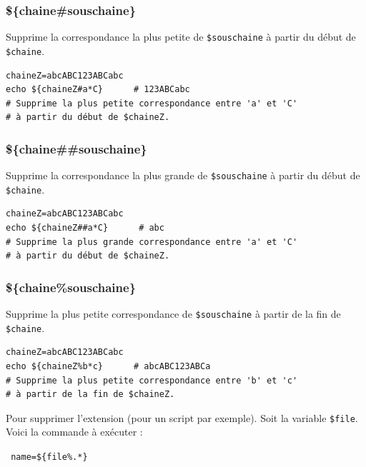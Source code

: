 \documentclass[a4paper,twoside]{article}
\begin{document}
\subsubsection{\$\{chaine\#souschaine\}}
Supprime la correspondance la plus petite de \verb|$souschaine| à partir du début de \verb|$chaine|.

\begin{exemple}
\begin{verbatim}
chaineZ=abcABC123ABCabc
echo ${chaineZ#a*C}      # 123ABCabc
# Supprime la plus petite correspondance entre 'a' et 'C'
# à partir du début de $chaineZ.
\end{verbatim}
\end{exemple}

\subsubsection{\$\{chaine\#\#souschaine\}}
Supprime la correspondance la plus grande de \verb|$souschaine| à partir du début de \verb|$chaine|.

\begin{exemple}
\begin{verbatim}
chaineZ=abcABC123ABCabc
echo ${chaineZ##a*C}      # abc
# Supprime la plus grande correspondance entre 'a' et 'C'
# à partir du début de $chaineZ.
\end{verbatim}
\end{exemple}

\subsubsection{\$\{chaine\%souschaine\}}
Supprime la plus petite correspondance de \verb|$souschaine| à partir de la fin de \verb|$chaine|.

\begin{exemple}
\begin{verbatim}
chaineZ=abcABC123ABCabc
echo ${chaineZ%b*c}      # abcABC123ABCa
# Supprime la plus petite correspondance entre 'b' et 'c'
# à partir de la fin de $chaineZ.
\end{verbatim}
\end{exemple}


\begin{remarque}
Pour supprimer l'extension (pour un script par exemple). Soit la variable \texttt{\$file}. Voici la commande à exécuter :

\verb| name=${file%.*}|
\end{remarque}
\end{document}
